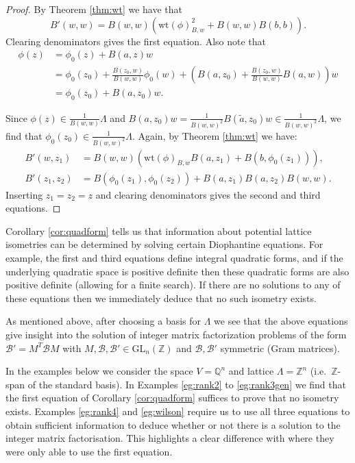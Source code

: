 \documentclass{amsart}
\theoremstyle{plain}
\theoremstyle{definition}
\begin{document}
\begin{proof}
By Theorem \ref{thm:wt} we have that \[B'(w,w) = B(w,w)(\text{wt}(\phi)_{B,w}^2 + B(w,w)B(b,b)).\] Clearing denominators gives the first equation. Also note that
\begin{align*}
\phi(z) &=\phi_0(z) + B(a,z)w\\ &= \phi_0(z_0) + \frac{B(z_0,w)}{B(w,w)}\phi_0(w) + \left(B(a,z_0) + \frac{B(z_0,w)}{B(w,w)}B(a,w)\right)w\\ &= \phi_0(z_0) + B(a,z_0)w.
\end{align*}

Since $\phi(z)\in \frac{1}{B(w,w)}\Lambda$ and $B(a,z_0)w = \frac{1}{B(w,w)^2}B(\tilde{a},z_0)w\in \frac{1}{B(w,w)^2}\Lambda$, we find that $\phi_0(z_0)\in\frac{1}{B(w,w)^2}\Lambda$. Again, by Theorem \ref{thm:wt} we have: \begin{align*}B'(w,z_1) &= B(w,w)(\text{wt}(\phi)_{B,w}B(a,z_1)+B(b,\phi_0(z_1))),\\ B'(z_1,z_2) &= B(\phi_0(z_1), \phi_0(z_2)) + B(a,z_1)B(a,z_2)B(w,w).\end{align*} Inserting $z_1 = z_2 = z$  and clearing denominators gives the second and third equations.
\end{proof}

Corollary \ref{cor:quadform} tells us that information about potential lattice isometries can be determined by solving certain Diophantine equations. For example, the first and third equations define integral quadratic forms, and if the underlying quadratic space is positive definite then these quadratic forms are also positive definite (allowing for a finite search). If there are no solutions to any of these equations then we immediately deduce that no such isometry exists.

As mentioned above, after choosing a basis for $\Lambda$ we see that the above equations give insight into the solution of integer matrix factorization problems of the form $\mathcal{B}' = M^T \mathcal{B}M$ with $M,\mathcal{B},\mathcal{B}'\in \text{GL}_n(\mathbb{Z})$ and $\mathcal{B},\mathcal{B}'$ symmetric (Gram matrices).

In the examples below we consider the space $V = \mathbb{Q}^n$ and lattice $\Lambda = \mathbb{Z}^n$ (i.e.\ $\mathbb{Z}$-span of the standard basis). In  
Examples \ref{eg:rank2} to \ref{eg:rank3gen} we find that the first equation of Corollary \ref{cor:quadform} suffices to prove that no isometry exists. Examples \ref{eg:rank4} and \ref{eg:wilson} require us to use all three equations to obtain sufficient information to deduce whether or not there is a solution to the integer matrix factorisation. This highlights a clear difference with \cite{higham} where they were only able to use the first equation.
\end{document}
